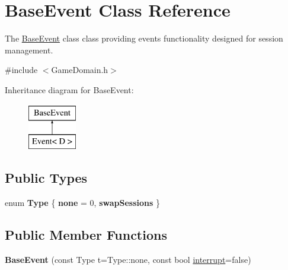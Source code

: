 \hypertarget{classBaseEvent}{}\section{Base\+Event Class Reference}
\label{classBaseEvent}


The \hyperlink{classBaseEvent}{Base\+Event} class class providing events functionality designed for session management.  




{\ttfamily \#include $<$Game\+Domain.\+h$>$}

Inheritance diagram for Base\+Event\+:\begin{figure}[H]
\begin{center}
\leavevmode
\includegraphics[height=2.000000cm]{classBaseEvent}
\end{center}
\end{figure}
\subsection*{Public Types}
\begin{DoxyCompactItemize}
\item 
\hypertarget{classBaseEvent_a2b68f24856d788f3abd3c3d812681343}{}enum {\bfseries Type} \{ {\bfseries none} = 0, 
{\bfseries swap\+Sessions}
 \}\label{classBaseEvent_a2b68f24856d788f3abd3c3d812681343}

\end{DoxyCompactItemize}
\subsection*{Public Member Functions}
\begin{DoxyCompactItemize}
\item 
\hypertarget{classBaseEvent_a41f97990ea1994b5e6feaa4a4f1a381e}{}{\bfseries Base\+Event} (const Type t=Type\+::none, const bool \hyperlink{classBaseEvent_a57cb919c14ba312f0a6c5e5bfdc52135}{interrupt}=false)\label{classBaseEvent_a41f97990ea1994b5e6feaa4a4f1a381e}

\end{DoxyCompactItemize}

